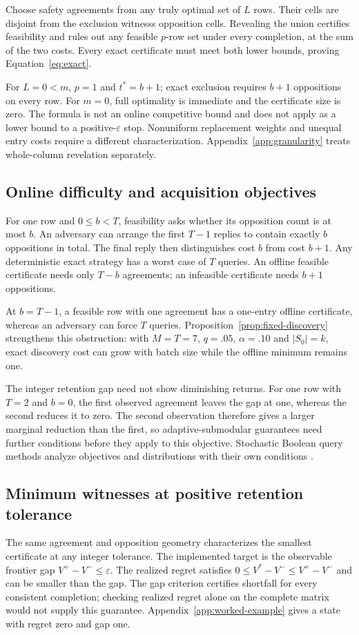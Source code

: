 Choose safety agreements from any truly optimal set of $L$ rows. Their cells are disjoint from the exclusion witness\textquotesingle s opposition cells. Revealing the union certifies feasibility and rules out any feasible $p$-row set under every completion, at the sum of the two costs. Every exact certificate must meet both lower bounds, proving Equation~\ref{eq:exact}.

For $L=0<m$, $p=1$ and $t^*=b+1$; exact exclusion requires $b+1$ oppositions on every row. For $m=0$, full optimality is immediate and the certificate size is zero. The formula is not an online competitive bound and does not apply as a lower bound to a positive-$\varepsilon$ stop. Nonuniform replacement weights and unequal entry costs require a different characterization. Appendix~\ref{app:granularity} treats whole-column revelation separately.

\subsection{Online difficulty and acquisition objectives}
For one row and $0\le b<T$, feasibility asks whether its opposition count is at most $b$. An adversary can arrange the first $T-1$ replies to contain exactly $b$ oppositions in total. The final reply then distinguishes cost $b$ from cost $b+1$. Any deterministic exact strategy has a worst case of $T$ queries. An offline feasible certificate needs only $T-b$ agreements; an infeasible certificate needs $b+1$ oppositions.

At $b=T-1$, a feasible row with one agreement has a one-entry offline certificate, whereas an adversary can force $T$ queries. Proposition~\ref{prop:fixed-discovery} strengthens this obstruction: with $M=T=7$, $q=.05$, $\alpha=.10$ and $|S_0|=k$, exact discovery cost can grow with batch size while the offline minimum remains one.

The integer retention gap need not show diminishing returns. For one row with $T=2$ and $b=0$, the first observed agreement leaves the gap at one, whereas the second reduces it to zero. The second observation therefore gives a larger marginal reduction than the first, so adaptive-submodular guarantees need further conditions before they apply to this objective. Stochastic Boolean query methods analyze objectives and distributions with their own conditions \citep{deshpande2016sbfe,gkenosis2018ssclass}.

\subsection{Minimum witnesses at positive retention tolerance}
\label{app:gap-witness}
The same agreement and opposition geometry characterizes the smallest certificate at any integer tolerance. The implemented target is the observable frontier gap $V^+-V^-\le\varepsilon$. The realized regret satisfies $0\le V^*-V^-\le V^+-V^-$ and can be smaller than the gap. The gap criterion certifies shortfall for every consistent completion; checking realized regret alone on the complete matrix would not supply this guarantee. Appendix~\ref{app:worked-example} gives a state with regret zero and gap one.

